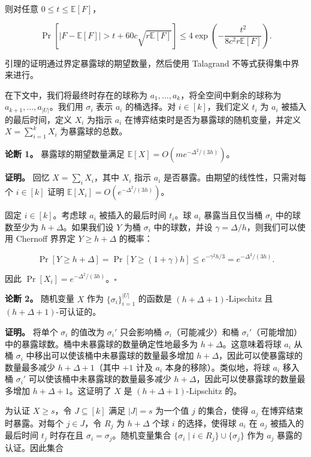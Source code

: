\documentclass[12pt,a4paper]{ctexart}
\theoremstyle{remark}
\begin{document}
则对任意 $0\leq t\leq\mathbb{E}[F]$，

$$\Pr\left[|F-\mathbb{E}[F]|>t+60c\sqrt{r\mathbb{E}[F]}\right]\leq4\exp\left(-\frac{t^2}{8c^2r\mathbb{E}[F]}\right).$$

引理的证明通过界定暴露球的期望数量，然后使用 Talagrand 不等式获得集中界来进行。

在下文中，我们将最终时存在的球称为 $a_1,\ldots,a_k$，将全空间中剩余的球称为 $a_{k+1},\ldots,a_{|U|}$。我们用 $\sigma_i$ 表示 $a_i$ 的桶选择。对 $i\in[k]$，我们定义 $t_i$ 为 $a_i$ 被插入的最后时间，定义 $X_i$ 为指示 $a_i$ 在博弈结束时是否为暴露球的随机变量，并定义 $X=\sum_{i=1}^k X_i$ 为暴露球的总数。

\textbf{论断 1。} 暴露球的期望数量满足 $\mathbb{E}[X]=O(me^{-\Delta^2/(3h)})$。

\textbf{证明。} 回忆 $X=\sum_i X_i$，其中 $X_i$ 指示 $a_i$ 是否暴露。由期望的线性性，只需对每个 $i\in[k]$ 证明 $\mathbb{E}[X_i]=O(e^{-\Delta^2/(3h)})$。

固定 $i\in[k]$。考虑球 $a_i$ 被插入的最后时间 $t_i$。球 $a_i$ 暴露当且仅当桶 $\sigma_i$ 中的球数至少为 $h+\Delta$。如果我们设 $Y$ 为桶 $\sigma_i$ 中的球数，并设 $\gamma=\Delta/h$，则我们可以使用 Chernoff 界界定 $Y\geq h+\Delta$ 的概率：

$$\Pr[Y\geq h+\Delta]=\Pr[Y\geq(1+\gamma)h]\leq e^{-\gamma^2 h/3}=e^{-\Delta^2/(3h)}.$$

因此 $\Pr[X_i]=e^{-\Delta^2/(3h)}$。$\square$

\textbf{论断 2。} 随机变量 $X$ 作为 $\{\sigma_i\}_{i=1}^{|U|}$ 的函数是 $(h+\Delta+1)$-Lipschitz 且 $(h+\Delta+1)$-可认证的。

\textbf{证明。} 将单个 $\sigma_i$ 的值改为 $\sigma_i'$ 只会影响桶 $\sigma_i$（可能减少）和桶 $\sigma_i'$（可能增加）中的暴露球数。桶中未暴露球的数量确定性地最多为 $h+\Delta$。这意味着将球 $a_i$ 从桶 $\sigma_i$ 中移出可以使该桶中未暴露球的数量最多增加 $h+\Delta$，因此可以使暴露球的数量最多减少 $h+\Delta+1$（其中 $+1$ 计及 $a_i$ 本身的移除）。类似地，将球 $a_i$ 移入桶 $\sigma_i'$ 可以使该桶中未暴露球的数量最多减少 $h+\Delta$，因此可以使暴露球的数量最多增加 $h+\Delta+1$。这证明了 $X$ 是 $(h+\Delta+1)$-Lipschitz 的。

为认证 $X\geq s$，令 $J\subseteq[k]$ 满足 $|J|=s$ 为一个值 $j$ 的集合，使得 $a_j$ 在博弈结束时暴露。对每个 $j\in J$，令 $R_j$ 为 $h+\Delta$ 个球 $i$ 的选择，使得球 $a_i$ 在 $a_j$ 被插入的最后时间 $t_j$ 时存在且 $\sigma_i=\sigma_j$。随机变量集合 $\{\sigma_i\mid i\in R_j\}\cup\{\sigma_j\}$ 作为 $a_j$ 暴露的认证。因此集合
\end{document}
